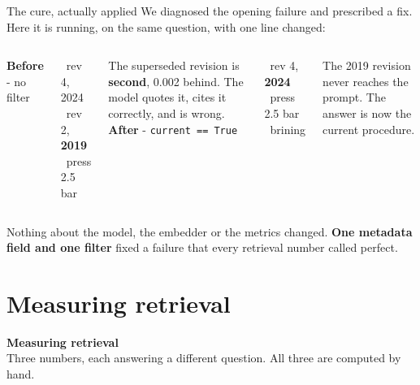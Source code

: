 \documentclass[aspectratio=169]{beamer}
\newcommand{\takebox}[1]{%
  \begin{tcolorbox}[colback=paramgreen!8, colframe=paramgreen, boxrule=0.6pt, arc=2pt]
  #1
  \end{tcolorbox}}
\newcommand{\sectiontransition}[2]{%
  \begin{frame}[plain]
    \vfill
    \begin{center}
      {\Huge\bfseries\color{popblue} #1}\\[1.1em]
      {\large #2}
    \end{center}
    \vfill
  \end{frame}}
\begin{document}
\begin{frame}{The cure, actually applied}
  \vspace{0.4em}
  We diagnosed the opening failure and prescribed a fix. Here it is running, on the same
  question, with one line changed:

  \vspace{0.5em}
  \begin{columns}[T]
      {\footnotesize\textbf{\color{armred}Before} - no filter}
      \begin{tcolorbox}[colback=armred!8, colframe=armred, boxrule=0.6pt, arc=2pt,
                        left=3pt, right=3pt, top=3pt, bottom=3pt]
        \ttfamily\scriptsize
        \rbrack\ rev 4, 2024\\
        \rbrack\ rev 2, \textbf{2019}\\
        \rbrack\ press 2.5 bar
      \end{tcolorbox}
      {\footnotesize The superseded revision is \textbf{second}, 0.002 behind. The model
      quotes it, cites it correctly, and is wrong.}
      {\footnotesize\textbf{\color{paramgreen}After} - \texttt{current == True}}
      \begin{tcolorbox}[colback=paramgreen!8, colframe=paramgreen, boxrule=0.6pt, arc=2pt,
                        left=3pt, right=3pt, top=3pt, bottom=3pt]
        \ttfamily\scriptsize
        \rbrack\ rev 4, \textbf{2024}\\
        \rbrack\ press 2.5 bar\\
        \rbrack\ brining
      \end{tcolorbox}
      {\footnotesize The 2019 revision never reaches the prompt. The answer is now the
      current procedure.}
  \end{columns}

  \vspace{0.7em}
  \takebox{Nothing about the model, the embedder or the metrics changed. \textbf{One
  metadata field and one filter} fixed a failure that every retrieval number called perfect.}
\end{frame}

\section{Measuring retrieval}
\sectiontransition{Measuring retrieval}{Three numbers, each answering a different question.
All three are computed by hand.}
\end{document}
